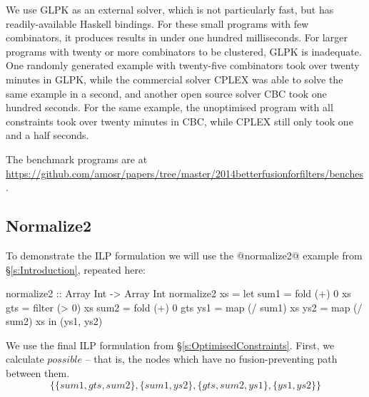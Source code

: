 We use GLPK as an external solver, which is not particularly fast, but has readily-available Haskell bindings.
For these small programs with few combinators, it produces results in under one hundred milliseconds.
For larger programs with twenty or more combinators to be clustered, GLPK is inadequate.
One randomly generated example with twenty-five combinators took over twenty minutes in GLPK, while the commercial solver CPLEX was able to solve the same example in a second, and another open source solver CBC took one hundred seconds.
For the same example, the unoptimised program with all constraints took over twenty minutes in CBC, while CPLEX still only took one and a half seconds.

The benchmark programs are at \url{https://github.com/amosr/papers/tree/master/2014betterfusionforfilters/benches}.



\subsection{Normalize2}
To demonstrate the ILP formulation we will use the @normalize2@ example from \S\ref{s:Introduction}, repeated here:
\begin{code}
  normalize2 :: Array Int -> Array Int
  normalize2 xs
   = let sum1 = fold   (+)  0   xs
         gts  = filter (>   0)  xs
         sum2 = fold   (+)  0   gts
         ys1  = map    (/ sum1) xs
         ys2  = map    (/ sum2) xs
     in (ys1, ys2)
\end{code}

We use the final ILP formulation from \S\ref{s:OptimisedConstraints}. First, we calculate $possible$ -- that is, the nodes which have no fusion-preventing path between them.
\[ \{ \{sum1, gts, sum2\}
 , \{sum1, ys2\}
 , \{gts, sum2, ys1\}
 , \{ys1, ys2\} \} \]


